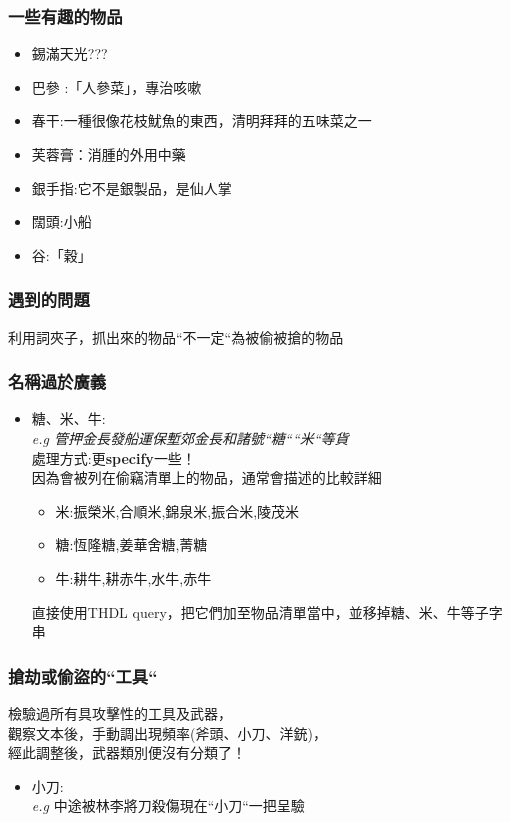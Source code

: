\documentclass{beamer}
\begin{document}
\begin{frame}
    \frametitle{一些有趣的物品}
    \begin{itemize}
        \item 錫滿天光???
        \item 巴參 :「人參菜」，專治咳嗽
        \item 春干:一種很像花枝魷魚的東西，清明拜拜的五味菜之一
        \item 芙蓉膏：消腫的外用中藥
        \item 銀手指:它不是銀製品，是仙人掌
        \item 闊頭:小船
        \item 谷:「穀」
    \end{itemize}
\end{frame}

\begin{frame}
\frametitle{遇到的問題}
    利用詞夾子，抓出來的物品``不一定``為被偷被搶的物品
\end{frame}

\begin{frame}
\frametitle{名稱過於廣義}
\begin{itemize}
    \item 糖、米、牛:\\
    \textit{e.g 管押金長發船運保塹郊金長和諸號``糖````米``等貨}\\
    \MVRightarrow{}處理方式:更\textbf{specify}一些！\\
    因為會被列在偷竊清單上的物品，通常會描述的比較詳細
    \begin{itemize}
        \item 米:振榮米,合順米,錦泉米,振合米,陵茂米
        \item 糖:恆隆糖,姜華舍糖,菁糖
        \item 牛:耕牛,耕赤牛,水牛,赤牛
    \end{itemize}
    \MVRightarrow{}直接使用THDL query，把它們加至物品清單當中，並移掉糖、米、牛等子字串
\end{itemize}
\end{frame}

\begin{frame}
\frametitle{搶劫或偷盜的``工具``}
檢驗過所有具攻擊性的工具及武器，\\
觀察文本後，手動調出現頻率(斧頭、小刀、洋銃)，\\
經此調整後，武器類別便沒有分類了！
\begin{itemize}
    \item 小刀:\\
    \textit{e.g} 中途被林李將刀殺傷現在``小刀``一把呈驗
\end{itemize}
\end{frame}
\end{document}

